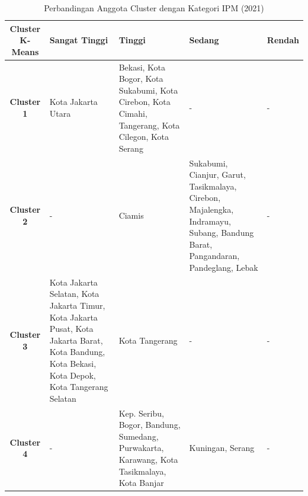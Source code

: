 \begin{table}[H]
\centering
\caption{Perbandingan Anggota Cluster dengan Kategori IPM (2021)} \label{tab:ipm_cross_2021}
\begin{tabular}{|c|p{2cm}|p{2cm}|p{2cm}|p{2cm}|}
\hline
\textbf{Cluster K-Means} & \textbf{Sangat Tinggi} & \textbf{Tinggi} & \textbf{Sedang} & \textbf{Rendah} \\ \hline
\textbf{Cluster 1} & Kota Jakarta Utara & Bekasi, Kota Bogor, Kota Sukabumi, Kota Cirebon, Kota Cimahi, Tangerang, Kota Cilegon, Kota Serang & - & - \\ \hline
\textbf{Cluster 2} & - & Ciamis & Sukabumi, Cianjur, Garut, Tasikmalaya, Cirebon, Majalengka, Indramayu, Subang, Bandung Barat, Pangandaran, Pandeglang, Lebak & - \\ \hline
\textbf{Cluster 3} & Kota Jakarta Selatan, Kota Jakarta Timur, Kota Jakarta Pusat, Kota Jakarta Barat, Kota Bandung, Kota Bekasi, Kota Depok, Kota Tangerang Selatan & Kota Tangerang & - & - \\ \hline
\textbf{Cluster 4} & - & Kep. Seribu, Bogor, Bandung, Sumedang, Purwakarta, Karawang, Kota Tasikmalaya, Kota Banjar & Kuningan, Serang & - \\ \hline
\end{tabular}
\end{table}